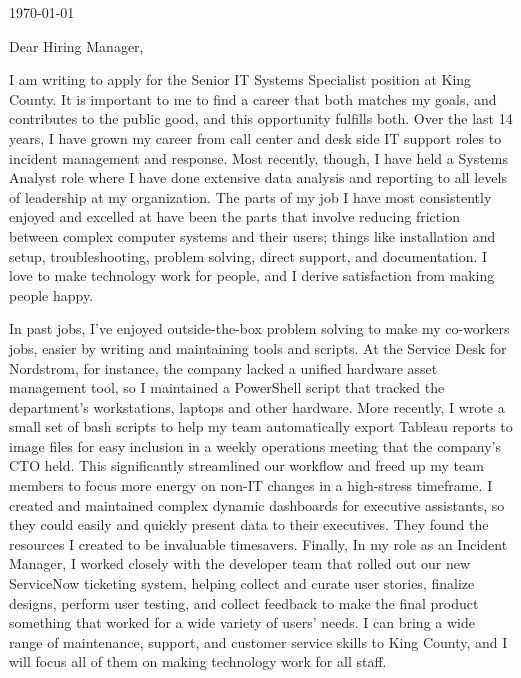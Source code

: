 \documentclass[10pt,oneside]{article}
\begin{document}
\hfill\dte\today
\heading
\vspace{\baselineskip}
\vspace{\baselineskip}

Dear Hiring Manager,

\vspace{\baselineskip}

I am writing to apply for the Senior IT Systems Specialist position at King County. It is important to me to find a career that both matches my goals, and contributes to the public good, and this opportunity fulfills both. Over the last 14 years, I have grown my career from call center and desk side IT support roles to incident management and response. Most recently, though, I have held a Systems Analyst role where I have done extensive data analysis and reporting to all levels of leadership at my organization. The parts of my job I have most consistently enjoyed and excelled at have been the parts that involve reducing friction between complex computer systems and their users; things like installation and setup, troubleshooting, problem solving, direct support, and documentation. I love to make technology work for people, and I derive satisfaction from making people happy.

\vspace{\baselineskip}

In past jobs, I’ve enjoyed outside-the-box problem solving to make my co-workers jobs, easier by writing and maintaining tools and scripts. At the Service Desk for Nordstrom, for instance, the company lacked a unified hardware asset management tool, so I maintained a PowerShell script that tracked the department’s workstations, laptops and other hardware. More recently, I wrote a small set of bash scripts to help my team automatically export Tableau reports to image files for easy inclusion in a weekly operations meeting that the company’s CTO held. This significantly streamlined our workflow and freed up my team members to focus more energy on non-IT changes in a high-stress timeframe. I created and maintained complex dynamic dashboards for executive assistants, so they could easily and quickly present data to their executives. They found the resources I created to be invaluable timesavers. Finally, In my role as an Incident Manager, I worked closely with the developer team that rolled out our new ServiceNow ticketing system, helping collect and curate user stories, finalize designs, perform user testing, and collect feedback to make the final product something that worked for a wide variety of users' needs. I can bring a wide range of maintenance, support, and customer service skills to King County, and I will focus all of them on making technology work for all staff.
\end{document}
